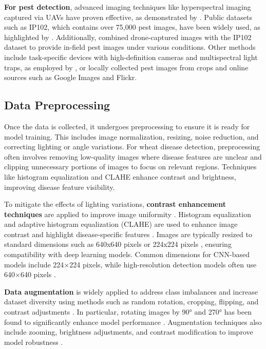\textbf{For pest detection}, advanced imaging techniques like hyperspectral imaging captured via UAVs have proven effective, as demonstrated by \parencite{zhang2019deep}. Public datasets such as IP102, which contains over 75,000 pest images, have been widely used, as highlighted by \parencite{ali2023faster}. Additionally, \parencite{albattah2023custom} combined drone-captured images with the IP102 dataset to provide in-field pest images under various conditions. Other methods include task-specific devices with high-definition cameras and multispectral light traps, as employed by \parencite{liu2019pestnet}, or locally collected pest images from crops and online sources such as Google Images and Flickr.

\subsection{Data Preprocessing}
Once the data is collected, it undergoes preprocessing to ensure it is ready for model training. This includes image normalization, resizing, noise reduction, and correcting lighting or angle variations. For wheat disease detection, preprocessing often involves removing low-quality images where disease features are unclear \parencite{yao2024yolo} and clipping unnecessary portions of images to focus on relevant regions. Techniques like histogram equalization \parencite{yao2024yolo} and CLAHE \parencite{reis2024integrated} enhance contrast and brightness, improving disease feature visibility.

To mitigate the effects of lighting variations, \textbf{contrast enhancement techniques} are applied to improve image uniformity \parencite{fang2023lightweight}. Histogram equalization and adaptive histogram equalization (CLAHE) are used to enhance image contrast and highlight disease-specific features \parencite{nigam2023deep}. Images are typically resized to standard dimensions such as 640x640 pixels \parencite{hassan2024wheat} or 224x224 pixels \parencite{reis2024integrated}, ensuring compatibility with deep learning models. Common dimensions for CNN-based models include 224×224 pixels, while high-resolution detection models often use 640×640 pixels \parencite{goyal2021leaf}.


\textbf{Data augmentation} is widely applied to address class imbalances and increase dataset diversity using methods such as random rotation, cropping, flipping, and contrast adjustments \parencite{ramadan2024improving} \parencite{hassan2024wheat}. In particular, rotating images by 90° and 270° has been found to significantly enhance model performance \parencite{nigam2023deep}. Augmentation techniques also include zooming, brightness adjustments, and contrast modification to improve model robustness \parencite{nigam2023deep}.

